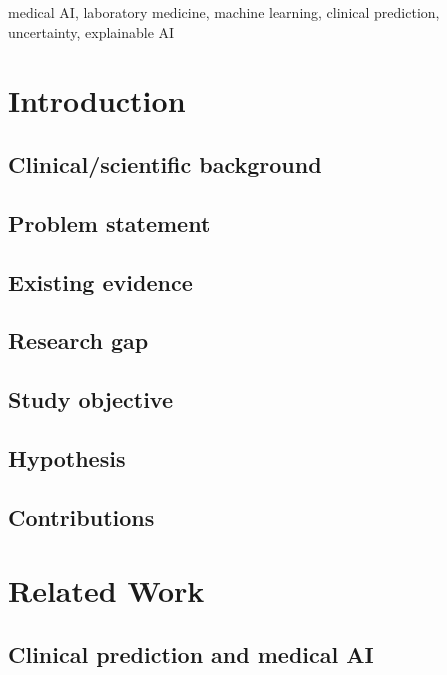 \documentclass[10pt,journal]{IEEEtran}
\title{\PaperTitle}
\author{\MirName, \MirRole, ORCID: \href{https://orcid.org/\MirORCID}{\MirORCID},\\
\SababaName, \SababaRole, ORCID: \href{https://orcid.org/\SababaORCID}{\SababaORCID}\\
\AffiliationOne\\
\AffiliationTwo\\
Corresponding author: \href{mailto:\CorrespondingEmail}{\CorrespondingEmail}}
\newcommand{\StudyKeywords}{medical AI, laboratory medicine, machine learning, clinical prediction, uncertainty, explainable AI}
\begin{document}
\maketitle

\begin{abstract}
\end{abstract}

\begin{IEEEkeywords}
\StudyKeywords
\end{IEEEkeywords}

\section{Introduction}
\subsection{Clinical/scientific background}
\subsection{Problem statement}
\subsection{Existing evidence}
\subsection{Research gap}
\subsection{Study objective}
\subsection{Hypothesis}
\subsection{Contributions}

\section{Related Work}
\subsection{Clinical prediction and medical AI}
\end{document}
